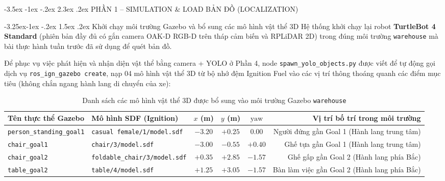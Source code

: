 \documentclass[11pt,a4paper]{article}
\makeatletter
\renewcommand{\section}{\@startsection{section}{1}{\z@}%
  {-3.5ex \@plus -1ex \@minus -.2ex}%
  {2.3ex \@plus.2ex}%
  {\normalfont\large\bfseries\color{primary}}}
\renewcommand{\subsection}{\@startsection{subsection}{2}{\z@}%
  {-3.25ex\@plus -1ex \@minus -.2ex}%
  {1.5ex \@plus .2ex}%
  {\normalfont\normalsize\bfseries\color{secondary}}}
\makeatother
\begin{document}
\newpage
\section{PHẦN 1 – SIMULATION \& LOAD BẢN ĐỒ (LOCALIZATION)}

\subsection{Khởi chạy môi trường Gazebo và bổ sung các mô hình vật thể 3D}
Hệ thống khởi chạy lại robot \textbf{TurtleBot 4 Standard} (phiên bản đầy đủ có gắn camera OAK-D RGB-D trên tháp cảm biến và RPLiDAR 2D) trong đúng môi trường \texttt{warehouse} mà bài thực hành tuần trước đã sử dụng để quét bản đồ.

Để phục vụ việc phát hiện và nhận diện vật thể bằng camera + YOLO ở Phần 4, node \texttt{spawn\_yolo\_objects.py} được viết để tự động gọi dịch vụ \texttt{ros\_ign\_gazebo create}, nạp 04 mô hình vật thể 3D từ bộ nhớ đệm Ignition Fuel vào các vị trí thông thoáng quanh các điểm mục tiêu (không chắn ngang hành lang di chuyển của xe):

\begin{table}[H]
\centering
\footnotesize
\setlength{\tabcolsep}{4pt}
\begin{tabularx}{\textwidth}{L{3.6cm}L{3.4cm}cccR}
\toprule
\textbf{\color{primary}Tên thực thể Gazebo} & \textbf{\color{primary}Mô hình SDF (Ignition)} & \textbf{\color{primary}$x$ (m)} & \textbf{\color{primary}$y$ (m)} & \textbf{\color{primary}$\text{yaw}$} & \textbf{\color{primary}Vị trí bố trí trong môi trường} \\
\midrule
\texttt{person\_standing\_goal1} & \texttt{casual female/1/}\newline\texttt{model.sdf} & $-3.20$ & $+0.25$ & $0.00$ & Người đứng gần Goal 1 (Hành lang trung tâm) \\
\texttt{chair\_goal1} & \texttt{chair/3/model.sdf} & $-3.00$ & $-0.55$ & $+0.40$ & Ghế tựa gần Goal 1 (Hành lang trung tâm) \\
\texttt{chair\_goal2} & \texttt{foldable\_chair/3/}\newline\texttt{model.sdf} & $+0.35$ & $+2.85$ & $-1.57$ & Ghế gấp gần Goal 2 (Hành lang phía Bắc) \\
\texttt{table\_goal2} & \texttt{table/4/model.sdf} & $+1.25$ & $+3.05$ & $-1.57$ & Bàn làm việc gần Goal 2 (Hành lang phía Bắc) \\
\bottomrule
\end{tabularx}
\caption{Danh sách các mô hình vật thể 3D được bổ sung vào môi trường Gazebo \texttt{warehouse}}
\label{tab:spawned_objects}
\end{table}
\end{document}
